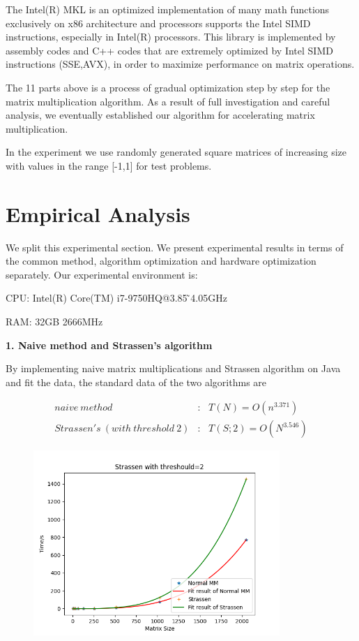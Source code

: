 \documentclass[UTF8]{ctexart}
\begin{document}
\begin{enumerate}
        The Intel(R) MKL is an optimized implementation of many math functions
        exclusively on x86 architecture and processors supports the Intel SIMD
        instructions, especially in Intel(R) processors. This library is
        implemented by assembly codes and C++ codes that are extremely
        optimized by Intel SIMD instructions (SSE,AVX), in order to maximize
        performance on matrix operations.
\end{enumerate}

The 11 parts above is a process of gradual optimization step by step for
the matrix multiplication algorithm. As a result of full investigation
and careful analysis, we eventually established our algorithm for
accelerating matrix multiplication.

In the experiment we use randomly generated square matrices of
increasing size with values in the range {[}-1,1{]} for test problems.

\section{Empirical Analysis}
\label{sec::EmpAnlys}
We split this experimental section. We present experimental results in
terms of the common method, algorithm optimization and hardware
optimization separately. Our experimental environment is:

CPU: Intel(R) Core(TM) i7-9750HQ@3.85 ̃4.05GHz

RAM: 32GB 2666MHz

\textbf{1. Naive method and Strassen's algorithm}

By implementing naive matrix multiplications and Strassen algorithm on
Java and fit the data, the standard data of the two algorithms are

\begin{equation}
  \begin{aligned}
    naive\ method                    & :\ \ \ T(N)=O(n^{3.371})   \\
    Strassen's\ (with\ threshold\ 2) & :\ \ \ T(S;2)=O(N^{3.546})
  \end{aligned}
\end{equation}

\begin{figure}[htb]
  \centering
  \includegraphics[height=7.0cm]{../ppt/slide-UIBK/th=2.png}
  \caption{}
\end{figure}
\end{document}
